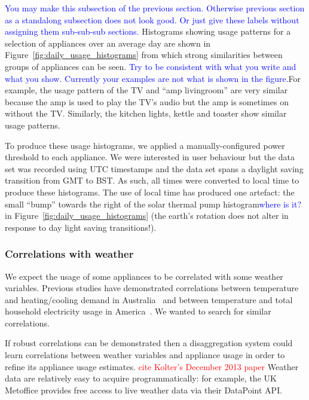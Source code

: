 \documentclass{sig-alternate}
\newcommand{\redcolor}[1]{\textcolor{red}{#1}}
\newcommand{\bluecolor}[1]{\textcolor{blue}{#1}}
\begin{document}
\noindent
\bluecolor{You may make this subsection of the previous section. Otherwise previous section as a standalong subsection does not look good. Or just give these labels without assigning them sub-sub-sub sections.}
Histograms showing usage patterns for a selection of appliances over
an average day are shown in Figure~\ref{fig:daily_usage_histograms} from which strong similarities between groups of appliances can be seen.  \bluecolor{Try to be consistent with what you write and what you show. Currently your examples are not what is shown in the figure.}For
example, the usage pattern of the TV and ``amp livingroom'' are very
similar because the amp is used to play the TV's audio but the amp is
sometimes on without the TV.  Similarly, the kitchen lights, kettle
and toaster show similar usage patterns.

To produce these usage histograms, we applied a manually-configured
power threshold to each appliance.  We were interested in user
behaviour but the data set was recorded using UTC timestamps and the
data set spans a daylight saving transition from GMT to BST.  As such,
all times were converted to local time to produce these histograms.
The use of local time has produced one artefact: the small ``bump''
towards the right of the solar thermal pump histogram\bluecolor{where is it?} in
Figure~\ref{fig:daily_usage_histograms} (the earth's rotation does not
alter in response to day light saving transitions!).

\subsubsection{Correlations with weather}

\noindent
We expect the usage of some appliances to be correlated with some
weather variables.  Previous studies have demonstrated correlations
between temperature and heating/cooling demand in
Australia~\cite{RicharddeDear2002} and between temperature and total
household electricity usage in America~\cite{Kavousian2013a}.  We
wanted to search for similar correlations.

If robust correlations can be demonstrated then a disaggregation
system could learn correlations between weather variables and
appliance usage in order to refine its appliance usage estimates. \redcolor{cite Kolter's December 2013 paper}
Weather data are relatively easy to acquire programmatically: for
example, the UK Metoffice provides free access to live weather data
via their DataPoint API.
\end{document}
